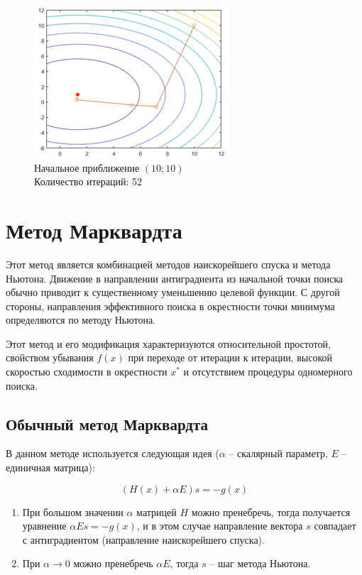 \documentclass[12pt]{article}
\begin{document}
\begin{enumerate}
\begin{enumerate}
	\begin{figure}[H]
    	\centering
    	\includegraphics[]{img/f8_3_3.png}
    	\\ Начальное приближение $\left( 10; 10 \right)$
    	\\ Количество итераций: 52
    \end{figure}

	\end{enumerate}
\end{enumerate}

\newpage
\section{Метод Марквардта}

Этот метод является комбинацией методов наискорейшего спуска и метода Ньютона. Движение в направлении антиградиента из начальной точки поиска обычно приводит к существенному уменьшению целевой функции. С другой стороны, направления эффективного поиска в окрестности точки минимума определяются по методу Ньютона.

Этот метод и его модификация характеризуются относительной простотой, свойством убывания $f(x)$ при переходе от итерации к итерации, высокой скоростью сходимости в окрестности $x^*$ и отсутствием процедуры одномерного поиска.

\subsection{Обычный метод Марквардта}

В данном методе используется следующая идея ($\alpha$ -- скалярный параметр, $E$ -- единичная матрица):

\[ \left( H(x) + \alpha E \right) s = -g(x) \]

\begin{enumerate}
	\item При большом значении $\alpha$ матрицей $H$ можно пренебречь, тогда получается уравнение $\alpha Es = -g(x)$, и в этом случае направление вектора $s$ совпадает с антиградиентом (направление наискорейшего спуска).
	\item При $\alpha \rightarrow 0$ можно пренебречь $\alpha E$, тогда $s$ -- шаг метода Ньютона.
\end{enumerate}
\end{document}
